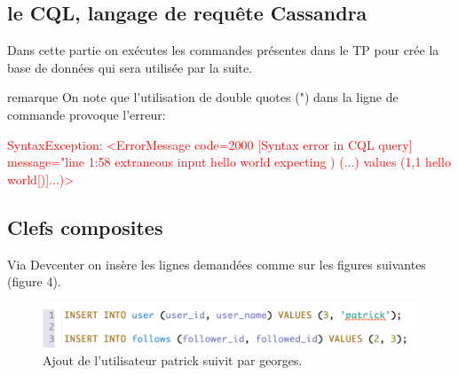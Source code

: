 \subsection{le CQL, langage de requête Cassandra}

\par Dans cette partie on exécutes les commandes présentes dans le TP pour crée la base de données
qui sera utilisée par la suite.
\begin{block}{remarque}
On note que l\rq utilisation de double quotes (") dans la ligne de commande provoque l'erreur: \newline
\begin{tt}
\textcolor{red}{
SyntaxException: <ErrorMessage code=2000 [Syntax error in CQL query]
message="line 1:58 extraneous input hello world expecting ) (...) values (1,1 hello world[)]...)>
}
\end{tt}
\end{block}

\subsection{Clefs composites}
Via Devcenter on insère les lignes demandées comme sur les figures suivantes (figure 4). \newline
\begin{figure}[h!]
\centering
\includegraphics[scale=0.7]{img/add_patrick.png}
\caption{Ajout de l'utilisateur patrick suivit par georges.}
\end{figure}

